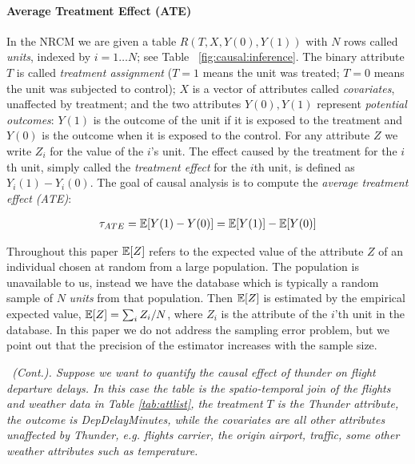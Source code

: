 \vspace{-.3cm}

\paragraph*{Average Treatment Effect (ATE)}
In the NRCM we are given a table $R(T,X,Y(0),Y(1))$ with
$N$ rows called {\em units}, indexed by $i=1 \ldots N$; see Table~
\ref{fig:causal:inference}.  The binary attribute $T$ is called {\em
  treatment assignment} ($T=1$ means the unit was treated; $T=0$ means
the unit was subjected to control); $X$ is a vector of attributes
called {\em covariates}, unaffected by treatment; and the two
attributes $Y(0), Y(1)$ represent {\em potential outcomes}: $Y(1)$ is
the outcome of the unit if it is exposed to the treatment and $Y(0)$
is the outcome when it is exposed to the control.  For any attribute
$Z$ we write $Z_i$ for the value of the $i$'s unit.  The effect caused
by the treatment for the $i$th unit, simply called the {\em treatment
  effect} for the $i$th unit, is defined as $Y_i(1)-Y_i(0)$.  The goal
of causal analysis is to compute the {\em average treatment effect
  (ATE)}:


\vspace{-.4cm}
\begin{align}
  \ate = \E[Y(1)-Y(0)] = \E[Y(1)] - \E[Y(0)] \ignore{=\frac{1}{N} \sum_i (Y_i(1)-Y_i(0))}  \label{eq:ate}
\end{align}


Throughout this paper $\E[Z]$ refers to the expected value of the
attribute $Z$ of an individual chosen at random from a large
population.  The population is unavailable to us, instead we have the
database which is typically a random sample of $N$ {\em units} from
that population.  Then $\E[Z]$ is estimated by the empirical expected
value, $\E[Z] = \sum_i Z_i/N$, where $Z_i$ is the attribute of the
$i$'th unit in the database.  In this paper we do not address the
sampling error problem, but we point out that the precision of the
estimator increases with the sample size.  
\vspace{-.15cm}
\begin{example} \em \label{exa1} \delay \ (Cont.). Suppose we want to
  quantify the causal effect of thunder on flight departure delays. In
  this case the table is the spatio-temporal join of the flights and
  weather data in Table \ref{tab:attlist}, the treatment $T$ is the
  Thunder attribute, the outcome is
  DepDelayMinutes, while the covariates are all other attributes
  unaffected by Thunder, e.g. flights carrier, the origin airport,
  traffic, some other weather attributes such as temperature.
\end{example}

